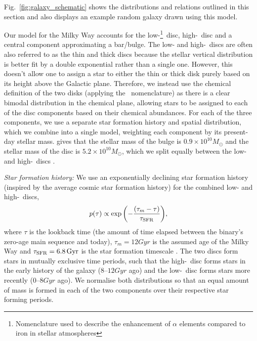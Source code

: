 Fig.~\ref{fig:galaxy_schematic} shows the distributions and relations outlined in this section and also displays an example random galaxy drawn using this model.

Our model for the Milky Way accounts for the low-\achem\footnote{Nomenclature used to describe the enhancement of $\alpha$ elements compared to iron in stellar atmospheres}~disc, high-\achem~disc and a central component approximating a bar/bulge. The low- and high-\achem~discs are often also referred to as the thin and thick discs because the stellar vertical distribution is better fit by a double exponential rather than a single one. However, this doesn't allow one to assign a star to either the thin or thick disk purely based on its height above the Galactic plane. Therefore, we instead use the chemical definition of the two disks (applying the \achem~nomenclature) as there is a clear bimodal distribution in the chemical plane, allowing stars to be assigned to each of the disc components based on their chemical abundances. For each of the three components, we use a separate star formation history and spatial distribution, which we combine into a single model, weighting each component by its present-day stellar mass. \citet{Licquia+2015} gives that the stellar mass of the bulge is $0.9 \times 10^{10} \unit{M_{\odot}}$ and the stellar mass of the disc is $5.2 \times 10^{10} \unit{M_\odot}$, which we split equally between the low- and high-\achem~discs \citep[e.g.,][]{Snaith+2014}.

\textit{Star formation history:} 
We use an exponentially declining star formation history \citep{Frankel+2018} (inspired by the average cosmic star formation history) for the combined low- and high-\achem~discs,
\begin{equation}\label{eq:thin_disc_tau}
    p(\tau) \propto \exp \qty(-\frac{(\tau_m - \tau)}{\tau_{\rm SFR}}),
\end{equation}
where $\tau$ is the lookback time (the amount of time elapsed between the binary's zero-age main sequence and today), $\tau_m = 12 \unit{Gyr}$ is the assumed age of the Milky Way and $\tau_{\rm SFR} = 6.8 \unit{Gyr}$ is the star formation timescale \citep{Frankel+2018}. The two discs form stars in mutually exclusive time periods, such that the high-\achem~disc forms stars in the early history of the galaxy ($8$--$12 \unit{Gyr}$ ago) and the low-\achem~disc forms stars more recently ($0$--$8 \unit{Gyr}$ ago). We normalise both distributions so that an equal amount of mass is formed in each of the two components over their respective star forming periods.

